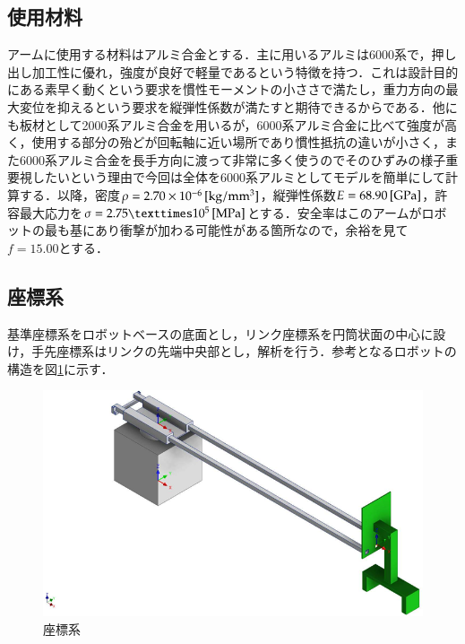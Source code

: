 \documentclass[10pt,b5paper,papersize,dvipdfmx]{jsbook}
\begin{document}
\subsection{使用材料}
アームに使用する材料はアルミ合金とする．主に用いるアルミは6000系で，押し出し加工性に優れ，強度が良好で軽量であるという特徴を持つ．これは設計目的にある素早く動くという要求を慣性モーメントの小ささで満たし，重力方向の最大変位を抑えるという要求を縦弾性係数が満たすと期待できるからである．他にも板材として2000系アルミ合金を用いるが，6000系アルミ合金に比べて強度が高く，使用する部分の殆どが回転軸に近い場所であり慣性抵抗の違いが小さく，また6000系アルミ合金を長手方向に渡って非常に多く使うのでそのひずみの様子重要視したいという理由で今回は全体を6000系アルミとしてモデルを簡単にして計算する．以降，密度$\rho=2.70\times 10^{-6}\tani*{kg/mm^3}$，縦弾性係数$E=68.90 \tani*{GPa}$，許容最大応力を$\sigma=2.75×10^{5} \tani*{MPa}$とする．安全率はこのアームがロボットの最も基にあり衝撃が加わる可能性がある箇所なので，余裕を見て$f=15.00$とする．
\subsection{座標系}\label{座標系}
基準座標系をロボットベースの底面とし，リンク座標系を円筒状面の中心に設け，手先座標系はリンクの先端中央部とし，解析を行う．参考となるロボットの構造を図\ref{fig:座標系}に示す．
\begin{figure}[htbp]
  \centering
  \includegraphics[width=12cm]{img/robot01.png}
  \caption{座標系}
  \label{fig:座標系}
\end{figure}
\end{document}
